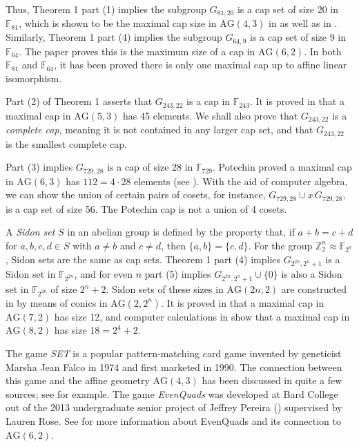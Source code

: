 \documentclass[12pt]{amsart}
\theoremstyle{definition}
\begin{document}
Thus, Theorem 1 part (1) implies the subgroup $G_{81,20}$ is a cap set
of size 20 in $\mathbb{F}_{81}$, which is shown to be the maximal cap
size in $\text{AG}(4,3)$ in \cite{Pellegrino1970} as well as in
\cite{DavisMaclagan2003}.  Similarly, Theorem 1 part (4) implies the
subgroup $G_{64,9}$ is a cap set of size 9 in $\mathbb{F}_{64}$. The
paper \cite{HowManyCardsEvenQuads2023} proves this is the maximum size
of a cap in $\text{AG}(6,2)$. In both $\mathbb{F}_{81}$ and
$\mathbb{F}_{64}$, it has been proved there is only one maximal cap up
to affine linear isomorphism.

Part (2) of Theorem 1 asserts that $G_{243,22}$ is a cap in
$\mathbb{F}_{243}$. It is proved in \cite{EdelFerretLandjevStorme2002}
that a maximal cap in $\text{AG}(5,3)$ has 45 elements.  We shall also
prove that $G_{243,22}$ is a \emph{complete cap}, meaning it is not
contained in any larger cap set, and that $G_{243,22}$ is the smallest
complete cap.

Part (3) implies $G_{729,28}$ is a cap of size 28 in
$\mathbb{F}_{729}$. Potechin proved a maximal cap in $\text{AG}(6,3)$
has $112=4\cdot 28$ elements (see \cite{Potechin2008}).  With the aid
of computer algebra, we can show the union of certain pairs of cosets,
for instance, $G_{729,28}\cup x\, G_{729,28}$, is a cap set of size
56.  The Potechin cap is not a union of 4 cosets.

A \emph{Sidon set} $S$ in an abelian group is defined by the property
that, if $a+b=c+d$ for $a,b,c,d\in S$ with $a\ne b$ and $c\ne d$, then
$\{a,b\}=\{c,d\}$. For the group
$\mathbb{Z}_2^n\approx \mathbb{F}_{2^n}$, Sidon sets are the same as
cap sets. Theorem 1 part (4) implies $G_{2^{2n},2^{n}+1}$ is a Sidon
set in $\mathbb{F}_{2^{2n}}$, and for even $n$ part (5) implies
$G_{2^{2n},2^{n}+1}\cup \{0\}$ is also a Sidon set in
$\mathbb{F}_{2^{2n}}$ of size $2^n+2$.  Sidon sets of these sizes in
$\text{AG}(2n,2)$ are constructed in \cite{Nagy2025} by means of
conics in $\text{AG}(2,2^n)$. It is proved in
\cite{CaltaGolbergRose2025} that a maximal cap in $\text{AG}(7,2)$ has
size 12, and computer calculations in \cite{CzerwinskiPott2024} show
that a maximal cap in $\text{AG}(8,2)$ has size $18=2^4+2$.

The game \emph{SET} is a popular pattern-matching card game invented
by geneticist Marsha Jean Falco in 1974 and first marketed in
1990. The connection between this game and the affine geometry
$\text{AG}(4,3)$ has been discussed in quite a few sources; see
\cite{JoyOfSET2017} for example.  The game \emph{EvenQuads} was
developed at Bard College out of the 2013 undergraduate senior project
of Jeffrey Pereira (\cite{Pereira2013}) supervised by Lauren Rose. See
\cite{Rose-chapter-2023} for more information about EvenQuads and its
connection to $\text{AG}(6,2)$.
\end{document}

